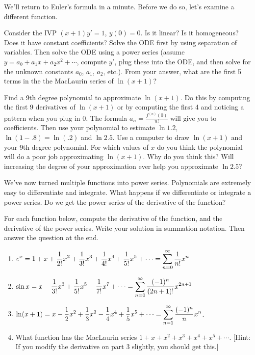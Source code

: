 
We'll return to Euler's formula in a minute.  Before we do so, let's examine a different function. 
\begin{problem}
 Consider the IVP $(x+1)y'=1$, $y(0)=0$.  Is it linear?  Is it homogeneous?  Does it have constant coefficients?  Solve the ODE first by using separation of variables. Then solve the ODE using a power series (assume $y=a_0+a_1x+a_2x^2+\cdots$, compute $y'$, plug these into the ODE, and then solve for the unknown constants $a_0$, $a_1$, $a_2$, etc.). From your answer, what are the first 5 terms in the the MacLaurin series of $\ln(x+1)$?
\end{problem}

\begin{problem}
 Find a 9th degree polynomial to approximate $\ln(x+1)$. Do this by computing the first 9 derivatives of $\ln(x+1)$ or by computing the first 4 and noticing a pattern when you plug in 0. The formula $a_n=\frac{f^{(n)}(0)}{n!}$ will give you to coefficients. 
 Then use your polynomial to estimate $\ln 1.2$, $\ln(1-.8)=\ln(.2)$ and $\ln 2.5$. Use a computer to draw $\ln(x+1)$ and your 9th degree polynomial. For which values of $x$ do you think the polynomial will do a poor job approximating $\ln(x+1)$.  Why do you think this?  Will increasing the degree of your approximation ever help you approximate $\ln 2.5$? 
\end{problem}


We've now turned multiple functions into power series. Polynomials are extremely easy to differentiate and integrate.  What happens if we differentiate or integrate a power series. Do we get the power series of the derivative of the function?
\begin{problem}
 For each function below, compute the derivative of the function, and the derivative of the power series.  Write your solution in summation notation. Then answer the question at the end.
\begin{enumerate}
 \item $\displaystyle e^x = 1+x+\frac{1}{2!}x^2+\frac{1}{3!}x^3+\frac{1}{4!}x^4+\frac{1}{5!}x^5+\cdots =\sum_{n=0}^\infty \frac{1}{n!}x^n$
 \item $\displaystyle \sin x = x-\frac{1}{3!}x^3+\frac{1}{5!}x^5-\frac{1}{7!}x^7+\cdots =\sum_{n=0}^\infty \frac{(-1)^n}{(2n+1)!}x^{2n+1}$
 \item $\displaystyle \ln(x+1) = x-\frac{1}{2}x^2+\frac{1}{3}x^3-\frac{1}{4}x^4+\frac{1}{5}x^5+\cdots = \sum_{n=1}^\infty \frac{(-1)^n}{n}x^{n}$.  
\item
What function has the MacLaurin series $1+x+x^2+x^3+x^4+x^5+\cdots$. [Hint: If you modify the derivative on part 3 slightly, you should get this.]
\end{enumerate}
\end{problem}



